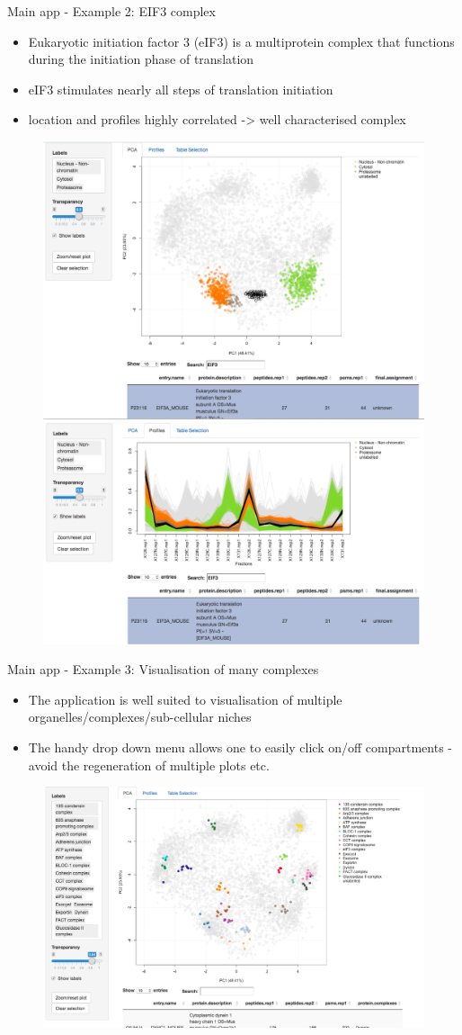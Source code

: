 \documentclass[bigger]{beamer}
\begin{document}
\begin{frame}{Main app - Example 2: EIF3 complex}
\smallskip
\footnotesize {
  \begin{itemize} 
  \item Eukaryotic initiation factor 3 (eIF3) is a multiprotein complex that functions during the initiation phase of translation
  \item eIF3 stimulates nearly all steps of translation initiation
  \item location and profiles highly correlated -> well characterised complex
  \end{itemize}
  }
  \begin{figure}
    \includegraphics[width=.5\linewidth]{Figures/demo2-eif3-pca.png}
    \includegraphics[width=.5\linewidth]{Figures/demo2-eif3-profiles.png}
  \end{figure}
\end{frame}
  


\begin{frame}{Main app - Example 3: Visualisation of many complexes}
\smallskip
\footnotesize {
  \begin{itemize} 
  \item The application is well suited to visualisation of multiple organelles/complexes/sub-cellular niches
  \item The handy drop down menu allows one to easily click on/off compartments - avoid 
  the regeneration of multiple plots etc.
  \end{itemize}
  }
  \begin{figure}
    \includegraphics[width=.7\linewidth]{Figures/demo3-protein-complexes.png}
  \end{figure}
\end{frame}
\end{document}
